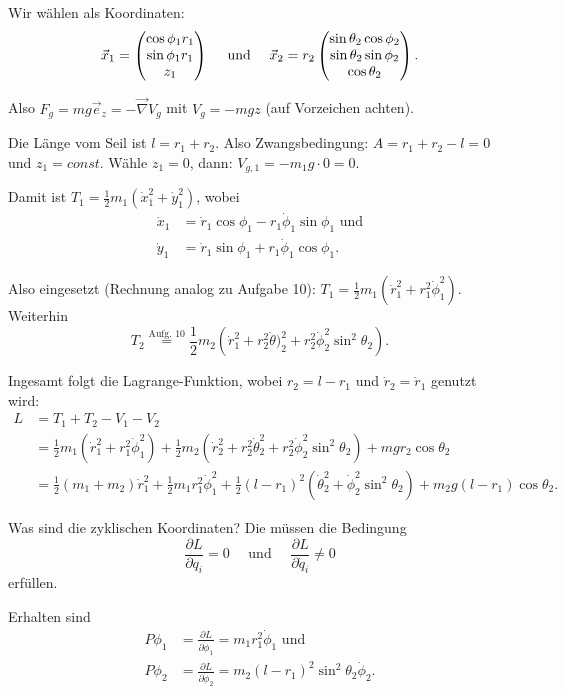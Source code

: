 Wir wählen als Koordinaten:
\[
	\vec{x}_1 = \begin{pmatrix}  \cos \phi_1 r_1 \\ \sin \phi_1 r_1 \\ z_1 \end{pmatrix} 
	\quad \text{ und } \quad 
	\vec{x}_2 = r_2 \begin{pmatrix}  \sin \theta_2 \cos \phi_2 \\ \sin \theta_2 \sin \phi_2 \\ \cos \theta_2  \end{pmatrix}
	\text{.}
\]

Also $F_g = m g \vec{e}_z = - \vec{\nabla} V_g$ mit $V_g = - m g z$ (auf Vorzeichen achten).

Die Länge vom Seil ist $l = r_1 + r_2$. Also Zwangsbedingung: $A = r_1 + r_2 - l = 0$ und $z_1 = const$. Wähle $z_1 = 0$, dann: $V_{g, 1} = - m_1 g \cdot 0 = 0$.

Damit ist $T_1 = \frac{1}{2} m_1 (\dot{x}_1^2 + \dot{y}_1^2)$, wobei 
\begin{align*}
	\dot{x}_1 &= \dot{r}_1 \cos \phi_1 - r_1 \dot{\phi}_1 \sin \phi_1 \text{ und} \\
	\dot{y}_1 &= \dot{r}_1 \sin \phi_1 + r_1 \dot{\phi}_1 \cos \phi_1 
	\text{.}	
\end{align*}

Also eingesetzt (Rechnung analog zu Aufgabe 10): $T_1 = \frac{1}{2} m_1 \left( \dot{r}_1^2 + r_1^2 \dot{\phi}_1^2 \right)$. Weiterhin 
\[
	T_2 \overset{\text{Aufg. 10}}{=} \frac{1}{2} m_2 \left( \dot{r}_1^2 + r_2^2 \dot{\theta})_2^2 + r_2^2 \dot{\phi}_2^2 \sin^2 \theta_2 \right)
	\text{.}
\]

Ingesamt folgt die Lagrange-Funktion, wobei $r_2 = l - r_1$ und $\dot{r}_2 = \dot{r}_1$ genutzt wird:
\begin{align*}
	L 
	&= T_1 + T_2 - V_1 - V_2 \\
	&= \frac{1}{2} m_1 \left( \dot{r}_1^2 + r_1^2 \dot{\phi}_1^2 \right)
	+ \frac{1}{2} m_2 \left( \dot{r}_2^2 + r_2 ^2 \dot{\theta}_2^2 + r_2^2 \dot{\phi}_2^2 \sin^2 \theta_2 \right)
	+ m g r_2 \cos \theta_2 \\
	&= \frac{1}{2} (m_1 + m_2) \dot{r}_1^2 
	+ \frac{1}{2} m_1 r_1^2 \dot{\phi}_1^2
	+ \frac{1}{2} (l - r_1)^2 (\dot{\theta}_2^2 + \dot{\phi}_2^2 \sin^2 \theta_2)
	+ m_2 g (l - r_1) \cos \theta_2
	\text{.}
\end{align*}

Was sind die zyklischen Koordinaten? Die müssen die Bedingung
\[
	\frac{\partial L}{\partial q_i} = 0 
	\quad \text{ und } \quad 
	\frac{\partial L}{\partial \dot{q}_i} \neq 0
\]
erfüllen.

Erhalten sind 
\begin{align*}
	P \phi_1 &= \frac{\partial L}{\partial \dot{\phi}_1} = m_1 r_1^2 \dot{\phi}_1 \text{ und } \\
	P \phi_2 &= \frac{\partial L}{\partial \dot{\phi}_2} = m_2 (l - r_1)^2 \sin^2 \theta_2 \dot{\phi}_2
	\text{.}
\end{align*}

